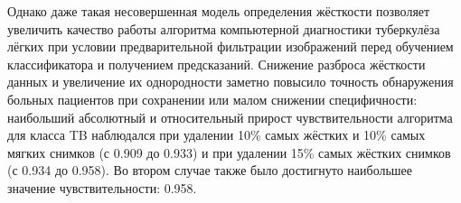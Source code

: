 Однако даже такая несовершенная модель определения жёсткости позволяет увеличить качество работы алгоритма компьютерной диагностики туберкулёза лёгких при условии предварительной фильтрации изображений перед обучением классификатора и получением предсказаний. Снижение разброса жёсткости данных и увеличение их однородности заметно повысило точность обнаружения больных пациентов при сохранении или малом снижении специфичности: наибольший абсолютный и относительный прирост чувствительности алгоритма для класса TB наблюдался при удалении 10\% самых жёстких и 10\% самых мягких снимков (с 0.909 до 0.933) и при удалении 15\% самых жёстких снимков (с 0.934 до 0.958). Во втором случае также было достигнуто наибольшее значение чувствительности: 0.958.


\FloatBarrier 
